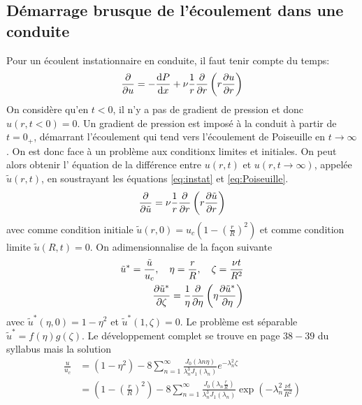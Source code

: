 \documentclass[a4paper,11pt]{report}
\newcommand{\recip}[1]{\frac{1}{#1}}
\begin{document}
    \subsection{Démarrage brusque de l'écoulement dans une conduite}
      Pour un écoulent instationnaire en conduite, il faut tenir compte du temps:
      \begin{equation}
        \pdv{u} = -\dv{P}{x} + \nu \frac{1}{r} \pdv{}{r} \left(r\pdv{u}{r}\right) \label{eq:instat}
      \end{equation}
      On considère qu'en $t<0$, il n'y a pas de gradient de pression et donc $u(r, t<0) = 0$. Un gradient de pression est imposé à la conduit à partir de $t=0_+$, démarrant l'écoulement qui tend vers l'écoulement de Poiseuille en $t \rightarrow \infty$. On est donc face à un problème aux conditionx limites et initiales. On peut alors obtenir l' équation de la différence entre $u(r, t)$ et $u(r, t\rightarrow\infty)$, appelée $\tilde{u}(r,t)$, en soustrayant les équations \ref{eq:instat} et \ref{eq:Poiseuille}.
      \begin{equation}
        \pdv{\tilde{u}} = \nu \frac{1}{r} \pdv{}{r} \left(r\pdv{\tilde{u}}{r}\right)
      \end{equation}
      avec comme condition initiale $\tilde{u}(r,0)=u_c\left(1-\left(\frac{r}{R}\right)^2\right)$ et comme condition limite $\tilde{u}(R,t)=0$. On adimensionnalise de la façon suivante
      \begin{equation}
        \begin{aligned}
          \tilde{u}^\ast = \frac{\tilde{u}}{u_c}, \quad \eta = \frac{r}{R}, \quad \zeta = \frac{\nu t}{R^2}\\
          \pdv{\tilde{u}^\ast}{\zeta} = \recip{\eta}\pdv{}{\eta}\left(\eta\pdv{\tilde{u}^\ast}{\eta}\right)
        \end{aligned}
      \end{equation}
      avec $\tilde{u}^\ast(\eta,0) = 1-\eta^2$ et $\tilde{u}^\ast(1, \zeta) = 0$. Le problème est séparable $\tilde{u}^\ast = f(\eta)g(\zeta)$. Le développement complet se trouve en page $38-39$ du syllabus mais la solution
      \begin{equation}
        \begin{aligned}
          \frac{u}{u_c} &= (1-\eta^2) - 8 \sum^\infty_{n=1} \frac{J_0(\lambda{n}\eta)}{\lambda_n^3 J_1(\lambda_n)}e^{-\lambda_n^2 \zeta}\\
          &= \left(1- \left(\frac{r}{R}\right)^2\right) - 8 \sum^\infty_{n=1} \frac{J_0\left(\lambda_n \frac{r}{R}\right)}{\lambda_n^3 J_1(\lambda_n)} \exp(-\lambda_n^2 \frac{\nu t}{R^2})
        \end{aligned}
      \end{equation}
\end{document}
